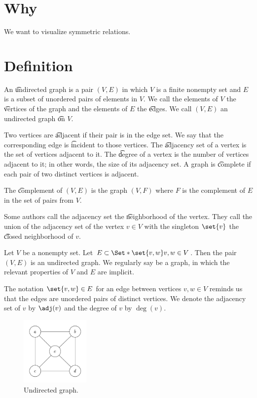 
\section{Why}

We want to visualize symmetric relations.

\section{Definition}

An \t{undirected graph} is a pair $(V, E)$ in which $V$ is a finite nonempty set and $E$ is a subset of unordered pairs of elements in $V$.
We call the elements of $V$ the \t{vertices} of the graph and the elements of $E$ the \t{edges}.
We call $(V, E)$ an undirected graph \t{on} $V$.

Two vertices are \t{adjacent} if their pair is in the edge set.
We say that the corresponding edge is \t{incident} to those vertices.
The \t{adjacency set} of a vertex is the set of vertices adjacent to it.
The \t{degree} of a vertex is the number of vertices adjacent to it; in other words, the size of its adjacency set.
A graph is \t{complete} if each pair of two distinct vertices is adjacent.

The \t{complement} of $(V, E)$ is the graph $(V, F)$ where $F$ is the complement of $E$ in the set of pairs from $V$.


Some authors call the adjacency set the \t{neighborhood} of the vertex.
They call the union of the adjacency set of the vertex $v \in V$ with the singleton $\set{v}$ the \t{closed neighborhood} of $v$.


Let $V$ be a nonempty set.
Let $E \subset \Set*{\set{v, w}}{v, w \in V}$.
Then the pair $(V, E)$ is an undirected graph.
We regularly say  be a graph, in which the relevant properties of $V$ and $E$ are implicit.

The notation $\set{v, w} \in E$ for an edge between vertices $v, w \in V$ reminds us that the edges are unordered pairs of distinct vertices.
We denote the adjacency set of $v$ by $\adj(v)$ and the degree of $v$ by $\deg(v)$.


\begin{figure}
  \centering
  \includegraphics[width=0.3\textwidth]{graphics_included/undirected_graph}
  \caption{Undirected graph.}
\end{figure}

